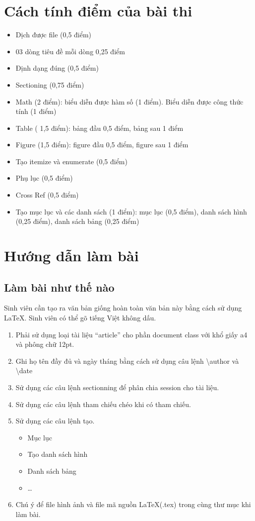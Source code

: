 \documentclass[a4paper,12pt]{article}
\title{\luge{Đề thi Kiến Thức Máy tính lớp Công nghệ thông tin Việt Pháp kỳ 20211-IT2120}}
\author{\large Nguyễn Hùng Cường - 20215264}
\date{\large \today}
\begin{document}
\maketitle
{}
\section{Cách tính điểm của bài thi}
\begin{itemize}
    \item Dịch được file (0,5 điểm)
    \item 03 dòng tiêu đề mỗi dòng 0,25 điểm
    \item Định dạng đúng (0,5 điểm)
    \item Sectioning (0,75 điểm)
    \item Math (2 điểm): biểu diễn được hàm số (1 điểm). Biểu diễn được công thức tính (1 điểm)
    \item Table ( 1,5 điểm): bảng đầu 0,5 điểm, bảng sau 1 điểm
    \item Figure (1,5 điểm): figure đầu 0,5 điểm, figure sau 1 điểm
    \item Tạo itemize và enumerate (0,5 điểm)
    \item Phụ lục (0,5 điểm)
    \item Cross Ref (0,5 điểm)
    \item Tạo mục lục và các danh sách (1 điểm): mục lục (0,5 điểm), danh sách hình (0,25 điểm), danh sách bảng (0,25 điểm)
\end{itemize}
\section{Hướng dẫn làm bài}
\subsection{Làm bài như thế nào}
Sinh viên cần tạo ra văn bản giống hoàn toàn văn bản này bằng cách sử dụng \LaTeX. Sinh viên có thể gõ tiếng Việt không dấu.
\begin{enumerate}
    \item Phải sử dụng loại tài liệu ``article'' cho phần document class với khổ giấy a4 và phông chữ 12pt.
    \item Ghi họ tên đầy đủ và ngày tháng bằng cách sử dụng câu lệnh \textbackslash author và \textbackslash date
    \item Sử dụng các câu lệnh sectionning để phân chia session cho tài liệu.
    \item Sử dụng các câu lệnh tham chiếu chéo khi có tham chiếu.
    \item Sử dụng các câu lệnh tạo.
    \begin{itemize}
        \item Mục lục
        \item Tạo danh sách hình
        \item Danh sách bảng
        \item \ldots
    \end{itemize}
    \item Chú ý để file hình ảnh và file mã nguồn \LaTeX(.tex) trong cùng thư mục khi làm bài.
\end{enumerate}
\end{document}
